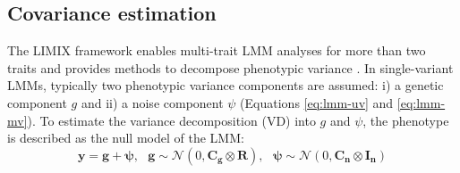 \subsection{Covariance estimation}
The LIMIX framework enables multi-trait LMM analyses for more than two traits and provides methods to decompose phenotypic variance \citep{Lippert2014}. In single-variant LMMs, typically two phenotypic variance components are assumed: i) a genetic component \(g\) and ii) a noise component \(\psi\) (Equations \ref{eq:lmm-uv} and \ref{eq:lmm-mv}). 
\noindent To estimate the variance decomposition (VD) into \(g\) and \(\psi\), the phenotype is described as the null model of the LMM:
\begin{equation}
\mathbf{y} = \mathbf{g}+\boldsymbol{\psi},\text{ }
\mathbf{g}\sim
\mathcal{N}\left(0,
\mathbf{C_g} \otimes \mathbf{R}\right),\text{ }
 \mathbf{\psi}\sim
\mathcal{N}\left(0,\mathbf{C_n} \otimes \mathbf{I_n}\right)
\label{eq:vd}
\end{equation}

